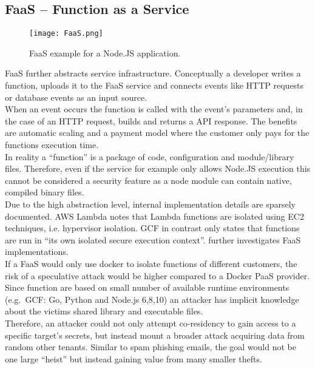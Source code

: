 \documentclass[conference,compsoc,final,a4paper]{IEEEtran}
\begin{document}
\subsection{\acs{FaaS} -- Function as a Service}
\begin{figure}[!ht]
\centering
\texttt{[image: FaaS.png]}
\caption{\ac{FaaS} example for a Node.JS application.}
\label{virtmem}
\end{figure}
\acs{FaaS} further abstracts service infrastructure. Conceptually a developer writes a function, uploads it to the \acs{FaaS} service and connects events like HTTP requests or
database events as an input source. \\
When an event occurs the function is called with the event's parameters and, in the case of an HTTP request, builds and
returns a API response. The benefits are automatic scaling and a payment model where the customer only pays for the functions execution time. \cite{lambdaFeatures}\\
In reality a \enquote{function} is a package of code, configuration and module/library files. Therefore, even if the service for example only allows Node.JS execution
this cannot be considered a security feature as a node module can contain native, compiled binary files. \cite{lambdaFaq} \\
Due to the high abstraction level, internal implementation details are sparsely documented. \ac{AWS} Lambda notes that Lambda functions are isolated using EC2 techniques, i.e.
hypervisor isolation\cite{lambdaFaq}. \ac{GCF} in contrast only states that functions are run in
\enquote{its own isolated secure execution context}\cite{cloudFunc}. \textcite{wang2018peeking} further investigates \acs{FaaS} implementations. \\
If a \acs{FaaS} would only use docker to isolate functions of different customers, the risk of a speculative attack would be higher compared to a Docker \ac{PaaS} provider. Since function are based on small number of available runtime environments (e.g.\ \ac{GCF}: Go, Python and Node.js 6,8,10) \cite{cloudFunc} an attacker has implicit knowledge
about the victims shared library and executable files. \\
Therefore, an attacker could not only attempt co-residency to gain access to a specific target's secrets, but instead mount a broader attack acquiring data from random
other tenants. Similar to spam phishing emails, the goal would not be one large \enquote{heist} but instead gaining value from many smaller thefts.
\end{document}
